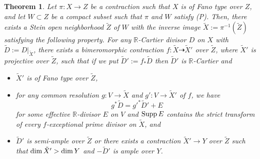 \documentclass[12pt]{amsart}
\newtheorem{thm}{Theorem}[section]
\theoremstyle{definition}
\begin{document}
\begin{thm}\label{thm--mmp-Fano-type}
Let $\pi \colon X \to Z$ be a contraction such that $X$ is of Fano type over $Z$, and let $W \subset Z$ be a compact subset such that $\pi$ and $W$ satisfy (P). 
Then, there exists a Stein open neighborhood $\tilde{Z}$ of $W$ with the inverse image $\tilde{X}:=\pi^{-1}(\tilde{Z})$ satisfying the following property. 
For any $\mathbb{R}$-Cartier divisor $D$ on $X$ with $\tilde{D}:=D|_{\tilde{X}}$, there exists a bimeromorphic contraction $f \colon \tilde{X} \dashrightarrow \tilde{X}'$ over $\tilde{Z}$, where $\tilde{X}'$ is projective over $\tilde{Z}$, such that if we put $\tilde{D}':=f_{*}\tilde{D}$ then $\tilde{D}'$ is $\mathbb{R}$-Cartier and 
\begin{itemize}
\item
$\tilde{X}'$ is of Fano type over $\tilde{Z}$, 
\item
for any common resolution $g \colon V \to \tilde{X}$ and $g' \colon V \to \tilde{X}'$ of $f$, we have
 $$g^{*}\tilde{D}=g'^{*}\tilde{D}'+E$$ 
 for some effective $\mathbb{R}$-divisor $E$ on $V$ and ${\rm Supp}\,E$ contains the strict transform of every $f$-exceptional prime divisor on $\tilde{X}$, and
\item
$\tilde{D}'$ is semi-ample over $\tilde{Z}$ or there exists a contraction $\tilde{X}' \to Y$ over $\tilde{Z}$ such that ${\rm dim}\,\tilde{X}' > {\rm dim}\,Y$ and $-\tilde{D}'$ is ample over $Y$.  
\end{itemize}
\end{thm}
\end{document}
